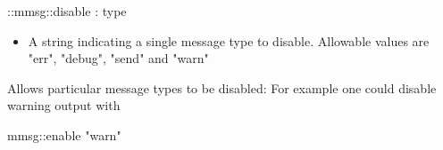 \begin{code}     
  ::mmsg::disable : type
\end{code}
\begin{itemize}
          \item {} A string indicating a single message type to disable. Allowable values are "err", "debug", "send" and "warn"
\end{itemize}
Allows particular message types to be disabled: For example one could disable warning output with
\begin{code}
       mmsg::enable "warn" 
\end{code}

